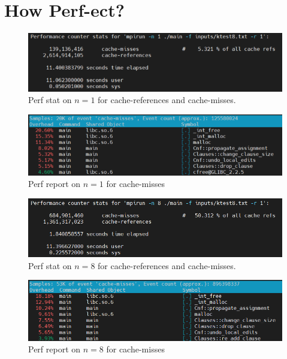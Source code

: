 \documentclass{article}
\begin{document}
\section{How Perf-ect?}

\begin{figure}[!htb]
    \centering
    \includegraphics[width=1\linewidth]{images/perf_n1_stat.png}
    \caption{Perf stat on $n=1$ for cache-references and cache-misses.}
\end{figure}
\begin{figure}[!htb]
    \centering
    \includegraphics[width=1\linewidth]{images/perf_n1.png}
    \caption{Perf report on $n=1$ for cache-misses}
    \label{fig:perf3}
\end{figure}

\begin{figure}[!htb]
    \centering
    \includegraphics[width=1\linewidth]{images/perf1.png}
    \caption{Perf stat on $n=8$ for cache-references and cache-misses.}
    \label{fig:perf1}
\end{figure}

\begin{figure}[!htb]
    \centering
    \includegraphics[width=\linewidth]{images/perf2.png}
    \caption{Perf report on $n=8$ for cache-misses}
    \label{fig:perf2}
\end{figure}

\newpage
\end{document}
